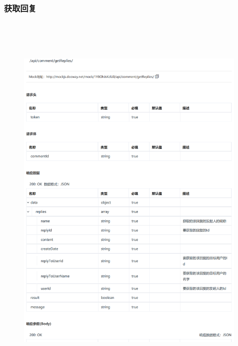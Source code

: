         \subsubsection{获取回复}
        \begin{figure}[h]
            \centering
            \includegraphics[height=19.0cm,width=14.0cm]{design/image/api21.png} 
            \end{figure}  
            \newpage    
